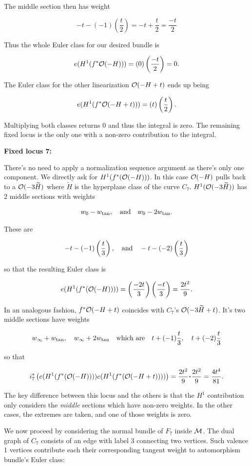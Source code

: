 \documentclass[12pt]{memoir}
\begin{document}
The middle section then has weight


\[-t-(-1)\left(\frac{t}{2}\right)=-t+\frac{t}{2}=\frac{-t}{2}\]


Thus the whole Euler class for our desired bundle is

\[e(H^1(f^\ast \mathcal{O}(-H)))=(0)\left(\frac{-t}{2}\right)=0.\]

\begin{Ej}
    The Euler class for the other linearization \(\mathcal{O}(-H+t)\) ends up being

    \[e(H^1(f^\ast \mathcal{O}(-H+t)))=(t)\left(\frac{t}{2}\right).\]

\end{Ej}

Multiplying both classes returns \(0\) and thus the integral is zero. The remaining fixed locus is the only one with a non-zero contribution to the integral.\par
\textbf{Fixed locus 7:}\par
There's no need to apply a normalization sequence argument as there's only one component. We directly ask for \(H^1(f^\ast(\mathcal{O}(-H)))\). In this case \(\mathcal{O}(-H)\) pulls back to a \(\mathcal{O}(-3\widetilde{H})\) where \(\widetilde{H}\) is the hyperplane class of the curve \(C_7\). \(H^1(\mathcal{O}(-3\widetilde{H}))\) has 2 middle sections with weights

\[w_0-w_{\tan},\quad\text{and}\quad w_0-2w_{\tan}.\]

These are

\[-t-(-1)\left(\frac{t}{3}\right),\quad\text{and}\quad-t-(-2)\left(\frac{t}{3}\right)\]

so that the resulting Euler class is

\[e(H^1(f^\ast(\mathcal{O}(-H))))=\left(\frac{-2t}{3}\right)\left(\frac{-t}{3}\right)=\frac{2t^2}{9}.\]

In an analogous fashion, \(f^\ast\mathcal{O}(-H+t)\) coincides with \(C_7\)'s \(\mathcal{O}(-3\widetilde{H}+t)\). It's two middle sections have weights

\[w_\infty+w_{\tan},\quad w_\infty+2w_{\tan}\quad\text{which are}\quad t+(-1)\frac{t}{3},\quad t+(-2)\frac{t}{3}\]

so that

\[i^\ast_7\left(e(H^1(f^\ast(\cO(-H))))e(H^1(f^\ast(\cO(-H+t))))\right)=\frac{2t^2}{9}\.\frac{2t^2}{9}=\frac{4t^4}{81}.\]

\begin{Rmk}
    The key difference between this locus and the others is that the \(H^1\) contribution only considers the \emph{middle} sections which have non-zero weights. In the other cases, the extremes are taken, and one of those weights is zero.
\end{Rmk}
We now proceed by considering the normal bundle of \(F_7\) inside \(\mathcal{M}\). The dual graph of \(C_7\) consists of an edge with label \(3\) connecting two vertices. Such valence 1 vertices contribute each their corresponding tangent weight to automorphism bundle's Euler class:
\end{document}

